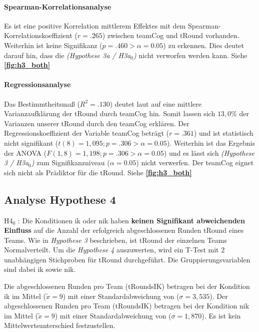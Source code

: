 \documentclass[a4paper,11pt]{article}%
\renewcommand{\\}{\vspace*{0.5\baselineskip} \newline}
\begin{document}
			\paragraph{Spearman-Korrelationsanalyse}
Es ist eine positive Korrelation mittlerem Effektes mit dem Spearman-Korrelationskoeffizient ($r = .265$) zwischen \ac{teamCog} und \ac{tRound} vorhanden. Weiterhin ist keine Signifikanz ($p = .460 > \alpha = 0.05$) zu erkennen. Dies deutet darauf hin, dass die \textit{(Hypothese 3a / H3a$_{0}$)} nicht verworfen werden kann. Siehe \textbf{\autoref{fig:h3_both}}
			
			\paragraph{Regressionsanalyse}
Das Bestimmtheitsmaß ($R^{2} = .130$) deutet laut \citep{cohen2013statistical} auf eine mittlere Varianzaufklärung der \ac{tRound} durch \ac{teamCog} hin. Somit lassen sich $13,0\%$ der Varianzen unserer \ac{tRound} durch den \ac{teamCog} erklären. \\
Der Regressionskoeffizient der Variable \ac{teamCog} beträgt ($r = .361$) und ist statistisch nicht signifikant ($t(8) = 1,095; p = .306 > \alpha = 0.05$). \\
Weiterhin ist das Ergebnis der ANOVA ($F(1,8) = 1,198; p = .306 > \alpha = 0.05$) und es lässt sich \textit{(Hypothese 3 / H3a$_{0}$)} zum Signifikanzniveau ($\alpha = 0.05$) nicht verwerfen. \\
Der \ac{teamCog} eignet sich nicht als Prädiktor für die \ac{tRound}.
Siehe \textbf{\autoref{fig:h3_both}}

\newpage
	\subsection{Analyse Hypothese 4}
H4$_{0}$ : Die Konditionen \ac{ik} oder \ac{nik} haben \textbf{keinen Signifikant abweichenden Einfluss} auf die Anzahl der erfolgreich abgeschlossenen Runden \ac{tRound} eines Teams.\\
Wie in \textit{Hypothese 3} beschrieben, ist \ac{tRound} der einzelnen Teams Normalverteilt.
Um die  \textit{Hypothese 4} auszuwerten, wird ein T-Test mit 2 unabhängigen Stichproben für \ac{tRound} durchgeführt. Die Gruppierungsvariablen sind dabei \ac{ik} sowie \ac{nik}.

Die abgeschlossenen Runden pro Team (\ac{tRoundsIK}) betragen bei der Kondition \ac{ik} im Mittel ($\tilde x = 9$) mit einer Standardabweichung von ($\sigma = 3,535$).\newline 
Der abgeschlossenen Runden pro Team (\ac{tRoundsIK}) betragen bei der Kondition \ac{nik} im Mittel ($\tilde x = 9$) mit einer Standardabweichung von ($\sigma = 1,870$). \newline 
Es ist kein Mittelwertsunterschied festzustellen.
\end{document}

